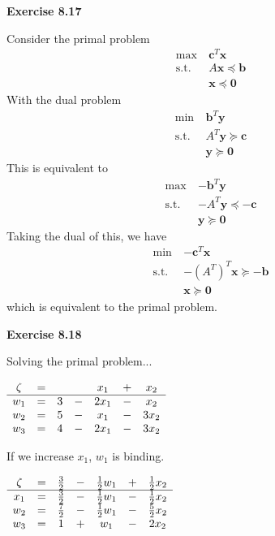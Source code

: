 \documentclass[letterpaper,12pt]{article}
\newcommand{\vect}[1]{\mathbf{#1}}
\begin{document}
\textbf{Exercise 8.17}

Consider the primal problem
\begin{align*}
\max \ & \vect{c}^T \vect{x} \\
\text{s.t.} \ & A \vect{x} \preceq \vect{b} \\
& \vect{x} \preceq \vect{0}
\end{align*}
With the dual problem
\begin{align*}
\min \ & \vect{b}^T \vect{y} \\
\text{s.t.} \ & A^T \vect{y} \succeq \vect{c} \\
& \vect{y} \succeq \vect{0}
\end{align*}
This is equivalent to
\begin{align*}
\max \ & \vect{-b}^T \vect{y} \\
\text{s.t.} \ & -A^T \vect{y} \preceq -\vect{c} \\
& \vect{y} \succeq \vect{0}
\end{align*}
Taking the dual of this, we have
\begin{align*}
\min \ & \vect{-c}^T \vect{x} \\
\text{s.t.} \ & -(A^T)^T \vect{x} \succeq -\vect{b} \\
& \vect{x} \succeq \vect{0}
\end{align*}
which is equivalent to the primal problem.

\textbf{Exercise 8.18}

Solving the primal problem...
\begin{center}
	$\begin{array}{ c c c c c c c c  }
	\zeta & = & & & x_1 & + & x_2 \\
	\hline
	w_1 & = & 3 & - & 2x_1 & - & x_2 \\
	w_2 & = & 5 & - & x_1 & - & 3x_2 \\
	w_3 & = & 4 & - & 2x_1 & - & 3x_2 \\
	\end{array}$ \\
\end{center}

If we increase $x_1$, $w_1$ is binding. \\

\begin{center}
	$\begin{array}{ c c c c c c c c  }
	\zeta & = & \frac{3}{2} & - & \frac{1}{2}w_1 & + & \frac{1}{2}x_2 \\
	\hline
	x_1 & = & \frac{3}{2} & - & \frac{1}{2}w_1 & - & \frac{1}{2}x_2 \\
	w_2 & = & \frac{7}{2} & - & \frac{1}{2}w_1 & - & \frac{5}{2}x_2 \\
	w_3 & = & 1 & + & w_1 & - & 2x_2 \\
	\end{array}$ \\
\end{center}
\end{document}
